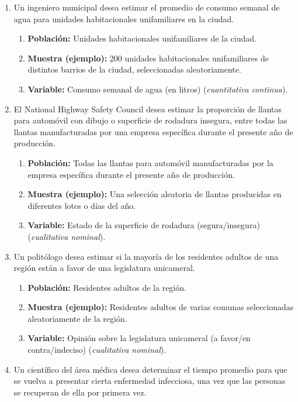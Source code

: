 \documentclass[12pt, letterpaper]{article}
\begin{document}
\begin{enumerate}
	\item Un ingeniero municipal desea estimar el promedio de consumo semanal de agua para unidades habitacionales unifamiliares en la ciudad.
	      \begin{enumerate}
		      \item \textbf{Población:} Unidades habitacionales unifamiliares de la ciudad.
		      \item \textbf{Muestra (ejemplo):} 200 unidades habitacionales unifamiliares de distintos barrios de la ciudad, seleccionadas aleatoriamente.
		      \item \textbf{Variable:} Consumo semanal de agua (en litros) (\textit{cuantitativa continua}).
	      \end{enumerate}
	\item El National Highway Safety Council desea estimar la proporción de llantas para automóvil con dibujo o superficie de rodadura insegura, entre todas las llantas manufacturadas por una empresa específica durante el presente año de producción.
	      \begin{enumerate}
		      \item \textbf{Población:} Todas las llantas para automóvil manufacturadas por la empresa específica durante el presente año de producción.
		      \item \textbf{Muestra (ejemplo):} Una selección aleatoria de llantas producidas en diferentes lotes o días del año.
		      \item \textbf{Variable:} Estado de la superficie de rodadura (segura/insegura) (\textit{cualitativa nominal}).
	      \end{enumerate}
	\item Un politólogo desea estimar si la mayoría de los residentes adultos de una región están a favor de una legislatura unicameral.
	      \begin{enumerate}
		      \item \textbf{Población:} Residentes adultos de la región.
		      \item \textbf{Muestra (ejemplo):} Residentes adultos de varias comunas seleccionadas aleatoriamente de la región.
		      \item \textbf{Variable:} Opinión sobre la legislatura unicameral (a favor/en contra/indeciso) (\textit{cualitativa nominal}).
	      \end{enumerate}
	\item Un científico del área médica desea determinar el tiempo promedio para que se vuelva a presentar cierta enfermedad infecciosa, una vez que las personas se recuperan de ella por primera vez.

\end{enumerate}
\end{document}
